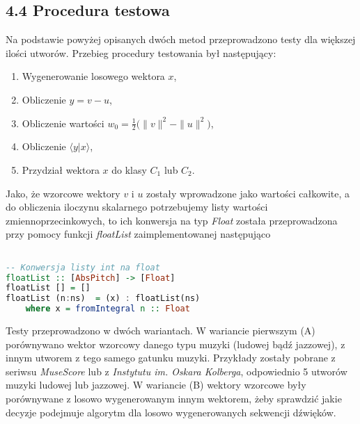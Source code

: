 \subsection{4.4 Procedura testowa}
Na podstawie powyżej opisanych dwóch metod przeprowadzono testy dla większej ilości utworów. Przebieg procedury testowania był następujący:
\begin{enumerate}
    \item Wygenerowanie losowego wektora $x$,
    \item Obliczenie $y = v - u$,
    \item Obliczenie wartości $w_{0} =\frac{1}{2} \big(\|v\|^{2} - \|u\|^{2}\big)$,
    \item Obliczenie $\big \langle y|x \big \rangle$,
    \item Przydział wektora $x$ do klasy $C_{1}$ lub $C_{2}$.
\end{enumerate}

Jako, że wzorcowe wektory $v$ i $u$ zostały wprowadzone jako wartości całkowite, a do obliczenia iloczynu skalarnego potrzebujemy listy wartości zmiennoprzecinkowych, to ich konwersja na typ \textit{Float} została przeprowadzona przy pomocy funkcji \textit{floatList} zaimplementowanej następująco

\begin{lstlisting}[language = Haskell]

-- Konwersja listy int na float
floatList :: [AbsPitch] -> [Float]
floatList [] = []
floatList (n:ns)  = (x) : floatList(ns)
    where x = fromIntegral n :: Float 
\end{lstlisting}

Testy przeprowadzono w dwóch wariantach. W wariancie pierwszym (A) porównywano wektor wzorcowy danego typu muzyki (ludowej bądź jazzowej), z innym utworem z tego samego gatunku muzyki. Przykłady zostały pobrane z seriwsu \textit{MuseScore} lub z \textit{Instytutu im. Oskara Kolberga}, odpowiednio 5 utworów muzyki ludowej lub jazzowej. W wariancie (B) wektory wzorcowe były porównywane z losowo wygenerowanym innym wektorem, żeby sprawdzić jakie decyzje podejmuje algorytm dla losowo wygenerowanych sekwencji dźwięków. 

